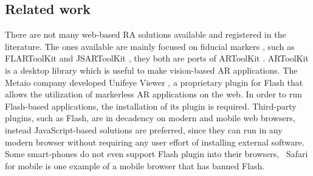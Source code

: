 \subsection{Related work} %
\label{sub:tracking_library_for_the_web:related_work}

There are not many web-based RA solutions available and registered in the literature. The ones available are mainly focused on fiducial markers \cite{Cho1998}, such as FLARToolKit \cite{Yan2011} and JSARToolKit \cite{JSARToolkit2011}, they both are ports of ARToolKit \cite{Hirokazu2002}. ARToolKit is a desktop library which is useful to make vision-based AR applications. The Metaio company developed Unifeye Viewer \cite{Metaio2009}, a proprietary plugin for Flash \cite{Flash2013} that allows the utilization of markerless AR applications on the web. In order to run Flash-based applications, the installation of its plugin is required. Third-party plugins, such as Flash, are in decadency on modern and mobile web browsers, instead JavaScript-based solutions are preferred, since they can run in any modern browser without requiring any user effort of installing external software. Some smart-phones do not even support Flash plugin into their browsers, \eg\ Safari for mobile \cite{Safari2013} is one example of a mobile browser that has banned Flash.

